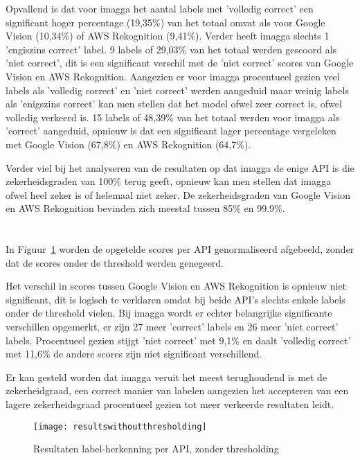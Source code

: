 Opvallend is dat voor imagga het aantal labels met 'volledig correct' een significant hoger percentage (19,35\%) van het totaal omvat als voor Google Vision (10,34\%) of AWS Rekognition (9,41\%). Verder heeft imagga slechts 1 'engiszins correct' label. 9 labels of 29,03\% van het totaal werden gescoord als 'niet correct', dit is een significant verschil met de 'niet correct' scores van Google Vision en AWS Rekognition. Aangezien er voor imagga procentueel gezien veel labels als 'volledig correct' en 'niet correct' werden aangeduid maar weinig labels als 'enigszins correct' kan men stellen dat het model ofwel zeer correct is, ofwel volledig verkeerd is. 15 labels of 48,39\% van het totaal werden voor imagga als 'correct' aangeduid, opnieuw is dat een significant lager percentage vergeleken met Google Vision (67,8\%) en AWS Rekognition (64,7\%).

Verder viel bij het analyseren van de resultaten op dat imagga de enige API is die zekerheidsgraden van 100\% terug geeft, opnieuw kan men stellen dat imagga ofwel heel zeker is of helemaal niet zeker. De zekerheidsgraden van Google Vision en AWS Rekognition bevinden zich meestal tussen 85\% en 99.9\%.

\section{}
\label{sec:resultaten-zonder-thresholding}
In Figuur~\ref{fig:resultswithoutthresholding} worden de opgetelde scores per API genormaliseerd afgebeeld, zonder dat de scores onder de threshold werden genegeerd.

Het verschil in scores tussen Google Vision en AWS Rekognition is opnieuw niet significant, dit is logisch te verklaren omdat bij beide API's slechts enkele labels onder de threshold vielen. Bij imagga wordt er echter belangrijke significante verschillen opgemerkt, er zijn 27 meer 'correct' labels en 26 meer 'niet correct' labels. Procentueel gezien stijgt 'niet correct' met 9,1\% en daalt 'volledig correct' met 11,6\% de andere scores zijn niet significant verschillend.

Er kan gesteld worden dat imagga veruit het meest terughoudend is met de zekerheidgraad, een correct manier van labelen aangezien het accepteren van een lagere zekerheidsgraad procentueel gezien tot meer verkeerde resultaten leidt.

\begin{figure}
    \centering    
    \texttt{[image: resultswithoutthresholding]}
    \caption{Resultaten label-herkenning per API, zonder thresholding}
    \label{fig:resultswithoutthresholding}
\end{figure}

